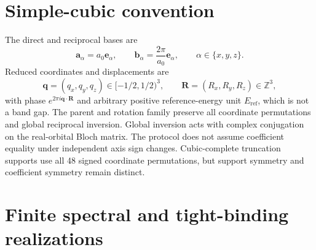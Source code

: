 \documentclass[11pt]{article}
\newcommand{\Z}{\mathbb Z}
\begin{document}
\section{Simple-cubic convention}

The direct and reciprocal bases are
\begin{equation}
 \mathbf a_\alpha=a_0\mathbf e_\alpha,
 \qquad
 \mathbf b_\alpha=\frac{2\pi}{a_0}\mathbf e_\alpha,
 \qquad \alpha\in\{x,y,z\}.
\end{equation}
Reduced coordinates and displacements are
\begin{equation}
 \mathbf q=(q_x,q_y,q_z)\in[-1/2,1/2)^3,
 \qquad
 \mathbf R=(R_x,R_y,R_z)\in\Z^3,
\end{equation}
with phase $e^{2\pi i\mathbf q\cdot\mathbf R}$ and arbitrary positive reference-energy
unit $E_{\mathrm{ref}}$, which is not a band gap.
The parent and rotation family preserve all coordinate permutations and global
reciprocal inversion. Global inversion acts with complex conjugation on the real-orbital
Bloch matrix. The protocol does not assume coefficient equality under independent axis
sign changes. Cubic-complete truncation supports use all 48 signed coordinate
permutations, but support symmetry and coefficient symmetry remain distinct.

\section{Finite spectral and tight-binding realizations}
\end{document}
